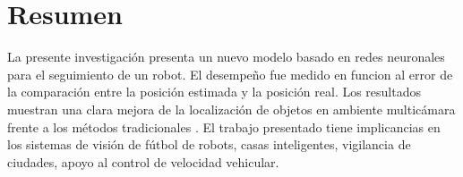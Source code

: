 
\chapter*{Resumen}
La presente investigaci\'on presenta un nuevo modelo basado en redes neuronales  para el seguimiento de un robot. El desempe\~no fue medido en funcion al error de la comparaci\'on entre la posici\'on estimada y la posici\'on real. Los resultados muestran una clara mejora de la localizaci\'on de objetos en ambiente multic\'amara frente a los m\'etodos tradicionales . El trabajo presentado tiene implicancias en los sistemas de visi\'on de f\'utbol de robots, casas inteligentes, vigilancia de ciudades, apoyo al control de velocidad vehicular.
